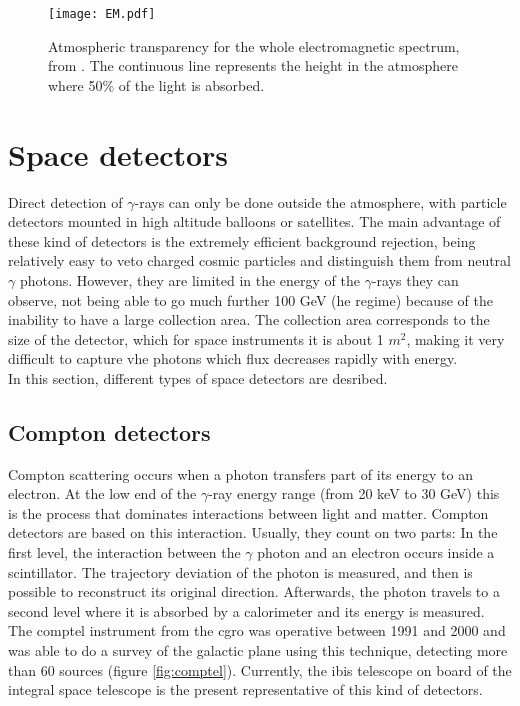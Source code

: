 \documentclass[main.tex]{subfiles}
\begin{document}
\begin{figure}
\centering
 \texttt{[image: EM.pdf]}
  \caption{Atmospheric transparency for the whole electromagnetic spectrum, from \cite{highenergyastrophy}. The continuous line represents the height in the atmosphere where 50\% of the light is absorbed.}
    \label{fig:atmoabsorb}
\end{figure}

\section{Space detectors} \label{sec:spacedet}

Direct detection of $\gamma$-rays can only be done outside the atmosphere, with particle detectors mounted in high altitude balloons or satellites. The main advantage of these kind of detectors is the extremely efficient background rejection, being relatively easy to veto charged cosmic particles and distinguish them from neutral $\gamma$ photons. However, they are limited in the energy of the $\gamma$-rays they can observe, not being able to go much further 100 GeV (\gls{he} regime) because of the inability to have a large collection area. The collection area corresponds to the size of the detector, which for space instruments it is about 1 $m^2$, making it very difficult to capture \gls{vhe} photons which flux decreases rapidly with energy.\\
In this section, different types of space detectors are desribed.\\

\subsection{Compton detectors}\label{sec:comptondetectors}

Compton scattering occurs when a photon transfers part of its energy to an electron. At the low end of the $\gamma$-ray energy range (from 20 keV to 30 GeV) this is the process that dominates interactions between light and matter. Compton detectors are based on this interaction. Usually, they count on two parts: In the first level, the interaction between the $\gamma$ photon and an electron occurs inside a scintillator. The trajectory deviation of the photon is measured, and then is possible to reconstruct its original direction. Afterwards, the photon travels to a second level where it is absorbed by a calorimeter and its energy is measured. The \gls{comptel} instrument from the \gls{cgro} was operative between 1991 and 2000 and was able to do a survey of the galactic plane using this technique, detecting more than 60 sources (figure \ref{fig:comptel}). Currently, the \gls{ibis} telescope on board of the \gls{integral} space telescope is the present representative of this kind of detectors.
\end{document}
